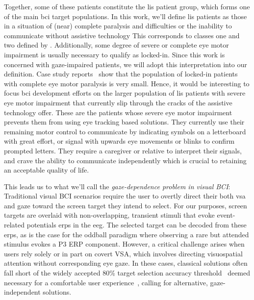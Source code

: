 Together, some of these patients constitute the \ac{lis} patient group, which
forms one of the main \ac{bci} target populations.
In this work, we'll define \ac{lis} patients as those in a situation of (near)
complete paralysis and difficulties or the inability to communicate without
assistive technology
This corresponds to classes one and two defined by
\textcite{Wolpaw2006}\fnwolpawcrit.
Additionally, some degree of severe or complete eye motor impairment is usually
necessary to qualify as locked-in\fnlis.
Since this work is concerned with gaze-impaired patients, we will adopt this
interpretation into our definition.
Case study reports~\cite{Patterson1986} show that the population of locked-in
patients with complete eye motor paralysis is very small.
Hence, it would be interesting to focus \ac{bci} development efforts on the
larger population of \ac{lis} patients with severe eye motor impairment that
currently slip through the cracks of the assistive technology offer.
These are the patients whose severe eye motor impairment prevents them from
using eye tracking based solutions.
They currently use their remaining motor control to
communicate by indicating symbols on a letterboard with great effort,
or signal with upwards eye movements or blinks to confirm prompted letters.
They require a caregiver or relative to interpret their signals, and crave
the ability to communicate independently which is crucial to retaining an
acceptable quality of life.

This leads us to what we'll call the \emph{gaze-dependence problem in visual
BCI}:
Traditional visual BCI scenarios require the user to overtly direct their both
\ac{vsa} and gaze toward the screen target they intend to select.
For our purposes, screen targets are overlaid with non-overlapping, transient
stimuli that evoke event-related  potentials \acp{erp} in the \ac{eeg}.
The selected target can be decoded from these \acp{erp}, as is the case for the
oddball paradigm where observing a rare but attended stimulus evokes a P3 ERP
component.
However, a critical challenge arises when users rely solely or in part on covert
VSA, which involves directing visuospatial attention without corresponding eye gaze.
In these cases, classical solutions often fall short of the widely accepted
80\% target selection accuracy threshold~\cite{Brunner2010,Frenzel2011,Treder2010,Ron2019} deemed necessary for a comfortable user
experience~\cite{Neeling2019}, calling for alternative, gaze-independent
solutions.

